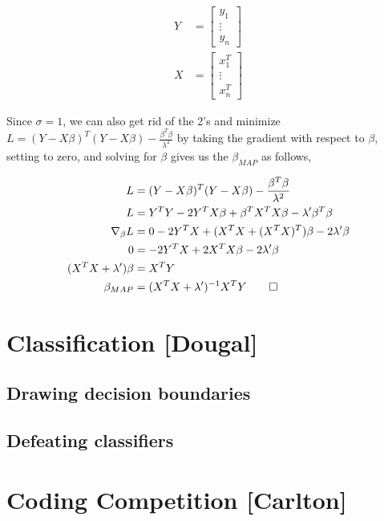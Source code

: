 \documentclass[letterpaper,10pt]{article} %
\newcommand{\prove}[1]{
\begin{Proof}
\begin{align*}
#1
\end{align*}
\end{Proof}
}
\begin{document}
\begin{align*}
Y &= \left[ \begin{array}{c}
y_1 \\
\vdots \\
y_n \end{array} \right] \\
X &= \left[ \begin{array}{c}
x_1^T \\
\vdots \\
x_n^T \end{array} \right]
\end{align*}

Since $\sigma=1$, we can also get rid of the 2's and minimize $L=(Y-X\beta)^T(Y-X\beta)-\frac{\beta^T\beta}{\lambda^2}$ by taking the gradient with respect to $\beta$, setting to zero, and solving for $\beta$ gives us the $\beta_{MAP}$ as follows,

\prove{
L &= (Y-X\beta)^T(Y-X\beta)-\frac{\beta^T\beta}{\lambda^2}\\
L &= Y^TY -2Y^TX\beta+\beta^TX^TX\beta-\lambda^\prime\beta^T\beta \\
\nabla_{\beta}L &= 0 - 2Y^TX + (X^TX +(X^TX)^T)\beta -2\lambda^\prime\beta \\
0 &= -2Y^TX+2X^TX\beta-2\lambda^\prime\beta \\
(X^TX+\lambda^\prime)\beta &= X^TY \\
\beta_{MAP} &= (X^TX+\lambda^\prime)^{-1}X^TY\qedhere
}


\newpage
\section{Classification [Dougal]}
\subsection{Drawing decision boundaries}
\subsection{Defeating classifiers}

\newpage
\section{Coding Competition [Carlton]}


%
%

\end{document}
